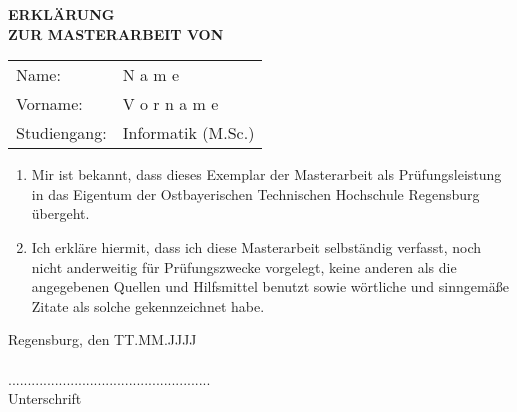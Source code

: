 
 \label{Ehrenwörtliche Erklärung}
\renewcommand{\thesection}{\Roman{section}}

    \onehalfspacing	
    
    \begin{center}
        \vspace*{2 cm} %
        \Large
        \textbf{ERKLÄRUNG \\ZUR MASTERARBEIT VON}
    \end{center}
        
	 \vspace*{1 cm} 
        \normalsize
        
	 \begin{table}[H]
        \begin{tabular}{ll}
        Name: & N a m e \\
        Vorname: & V o r n a m e \\
        Studiengang: & Informatik (M.Sc.)
        \end{tabular}
    \end{table}
    
     \vspace*{1 cm} 
        \normalsize
    

    \begin{enumerate}
        \item Mir ist bekannt, dass dieses Exemplar der Masterarbeit als Prüfungsleistung in das Eigentum der Ostbayerischen Technischen Hochschule Regensburg übergeht.\\
        
        \item Ich erkläre hiermit, dass ich diese Masterarbeit selbständig verfasst, noch nicht anderweitig für Prüfungszwecke vorgelegt, keine anderen als die angegebenen Quellen und Hilfsmittel benutzt sowie wörtliche und sinngemäße Zitate als solche gekennzeichnet habe. 
    \end{enumerate}


     \vspace*{3 cm} 
        \normalsize
        
    
    Regensburg, den TT.MM.JJJJ\\ \\
....................................................\\
Unterschrift